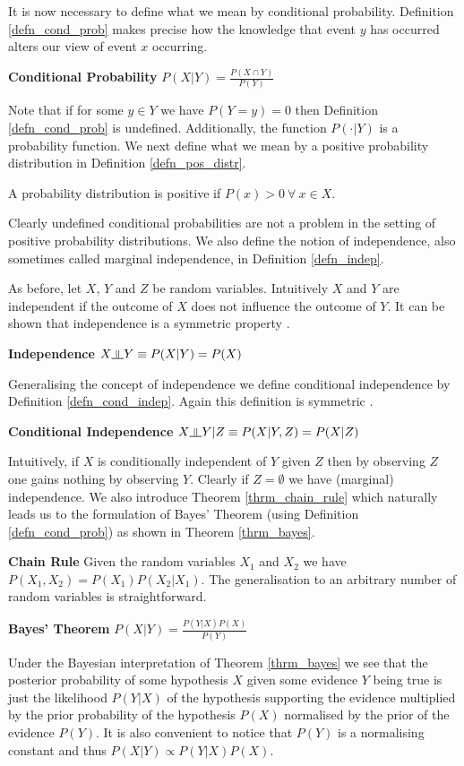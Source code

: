 It is now necessary to define what we mean by conditional probability. Definition \ref{defn_cond_prob} makes precise how the knowledge that event $y$ has occurred alters our view of event $x$ occurring.  
\begin{defn}
\textbf{Conditional Probability} $P(X|Y) = \frac{P(X \cap Y)}{P(Y)}$ 
\label{defn_cond_prob}
\end{defn}
Note that if for some $y \in Y$ we have $P(Y=y) = 0$ then Definition \ref{defn_cond_prob} is undefined. Additionally, the function $P(\cdot|Y)$ is a probability function. We next define what we mean by a positive probability distribution in Definition \ref{defn_pos_distr}.
\begin{defn}
A probability distribution is positive if $P(x) > 0~\forall~x \in X$.
\label{defn_pos_distr}
\end{defn}
Clearly undefined conditional probabilities are not a problem in the setting of positive probability distributions. We also define the notion of independence, also sometimes called marginal independence, in Definition \ref{defn_indep}. 

As before, let $X$, $Y$ and $Z$ be random variables. Intuitively $X$ and $Y$ are independent if the outcome of $X$ does not influence the outcome of $Y$. It can be shown that independence is a symmetric property \cite{koller}.
\begin{defn}
\textbf{Independence} $X \indep Y \equiv P(X|Y) = P(X)$ 
\label{defn_indep}
\end{defn}
Generalising the concept of independence we define conditional independence by Definition \ref{defn_cond_indep}. Again this definition is symmetric \cite{koller}.
\begin{defn}
\textbf{Conditional Independence} $X \indep Y | Z \equiv P(X|Y,Z) = P(X|Z)$
\label{defn_cond_indep}
\end{defn}
Intuitively, if $X$ is conditionally independent of $Y$ given $Z$ then by observing $Z$ one gains nothing by observing $Y$. Clearly if $Z=\emptyset$ we have (marginal) independence. We also introduce Theorem \ref{thrm_chain_rule} which naturally leads us to the formulation of Bayes' Theorem (using Definition \ref{defn_cond_prob}) as shown in Theorem \ref{thrm_bayes}. 
\begin{thrm}
\label{thrm_chain_rule}  
\textbf{Chain Rule} Given the random variables $X_1$ and $X_2$ we have $P(X_1,X_2) = P(X_1)P(X_2|X_1)$. The generalisation to an arbitrary number of random variables is straightforward.
\end{thrm}
\begin{thrm}
\textbf{Bayes' Theorem} $P(X|Y) = \frac{P(Y|X)P(X)}{P(Y)}$
\label{thrm_bayes}
\end{thrm}
Under the Bayesian interpretation of Theorem \ref{thrm_bayes} we see that the posterior probability of some hypothesis $X$ given some evidence $Y$ being true is just the likelihood $P(Y|X)$ of the hypothesis supporting the evidence multiplied by the prior probability of the hypothesis $P(X)$ normalised by the prior of the evidence $P(Y)$. It is also convenient to notice that $P(Y)$ is a normalising constant and thus  $P(X|Y) \propto P(Y|X)P(X)$.

